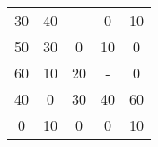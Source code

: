 \begin{tabular}{ccccc}
30     & 40     & -      & 0      & 10 \\
50     & 30     & 0      & 10     & 0 \\
60     & 10     & 20     & -      & 0 \\
40     & 0      & 30     & 40     & 60 \\
0      & 10     & 0      & 0      & 10 \bigstrut[b]\\
\hline
\hline
\end{tabular}%
